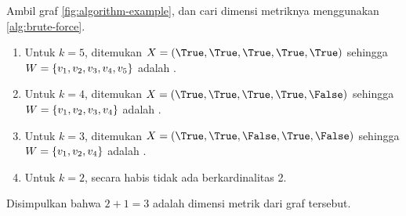 \begin{example}
	Ambil graf \autoref{fig:algorithm-example}, dan cari dimensi metriknya menggunakan \autoref{alg:brute-force}.
	\begin{enumerate}
		\item Untuk \(k = 5\), ditemukan \(X = (\True, \True, \True, \True, \True)\) sehingga \(W = \{v_1, v_2,\\ v_3, v_4, v_5\}\) adalah .
		\item Untuk \(k = 4\), ditemukan \(X = (\True, \True, \True, \True, \False)\) sehingga \(W = \{v_1, v_2,\\ v_3, v_4\}\) adalah .
		\item Untuk \(k = 3\), ditemukan \(X = (\True, \True, \False, \True, \False)\) sehingga \(W = \{v_1, v_2,\\ v_4\}\) adalah .
		\item Untuk \(k = 2\), secara habis tidak ada  berkardinalitas 2.
	\end{enumerate}
	Disimpulkan bahwa \(2 + 1 = 3\) adalah dimensi metrik dari graf tersebut.
\end{example}
